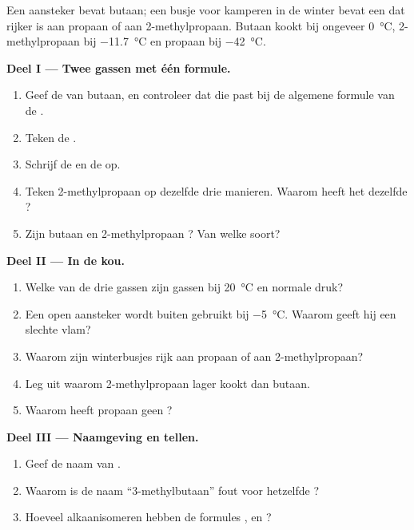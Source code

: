 \begin{problem}
\label{pb:g11:organic-skeletons:1}
Een aansteker bevat butaan; een busje voor kamperen in de winter bevat een
 dat rijker is aan propaan of aan 2-methylpropaan. Butaan kookt
bij ongeveer \qty{0}{\celsius}, 2-methylpropaan bij \qty{-11.7}{\celsius}
en propaan bij \qty{-42}{\celsius}.

\medskip
\noindent\textbf{Deel I --- Twee gassen met één formule.}
\begin{enumerate}
  \item Geef de  van butaan, en controleer dat die past bij
        de algemene formule van de .
  \item Teken de .
  \item Schrijf de  en de  op.
  \item Teken 2-methylpropaan op dezelfde drie manieren. Waarom heeft het
        dezelfde ?
  \item Zijn butaan en 2-methylpropaan ? Van welke soort?
\end{enumerate}

\medskip
\noindent\textbf{Deel II --- In de kou.}
\begin{enumerate}[resume]
  \item Welke van de drie gassen zijn gassen bij \qty{20}{\celsius} en
        normale druk?
  \item Een open aansteker wordt buiten gebruikt bij \qty{-5}{\celsius}.
        Waarom geeft hij een slechte vlam?
  \item Waarom zijn winterbusjes rijk aan propaan of aan 2-methylpropaan?
  \item Leg uit waarom 2-methylpropaan lager kookt dan butaan.
  \item Waarom heeft propaan geen ?
\end{enumerate}

\medskip
\noindent\textbf{Deel III --- Naamgeving en tellen.}
\begin{enumerate}[resume]
  \item Geef de naam van .
  \item Waarom is de naam ``3-methylbutaan'' fout voor hetzelfde
        ?
  \item Hoeveel alkaanisomeren hebben de formules ,
         en ?
\end{enumerate}


\end{problem}
